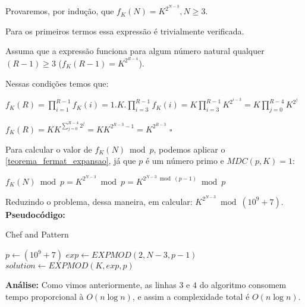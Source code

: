 Provaremos, por indução, que $f_K(N) = K^{2^{N-3}}, N \geq 3$.

Para os primeiros termos essa expressão é trivialmente verificada.

Assuma que a expressão funciona para algum número natural qualquer $(R-1) \geq 3$ ($f_K(R-1) = K^{2^{R-4}}$).

Nessas condições temos que: 

$f_K(R) = \prod_{i=1}^{R-1}f_K(i) = 1.K.\prod_{i=3}^{R-1}f_K(i) = K\prod_{i=3}^{R-1}K^{2^{i-3}} = K\prod_{j=0}^{R-4}K^{2^j}$

$f_K(R) = KK^{\sum_{j=0}^{R-4}2^j} = KK^{2^{R-3}-1} = K^{2^{R-3}}$ $\square$

Para calcular o valor de $f_K(N) \bmod p$, podemos aplicar o \autoref{teorema_fermat_expansao}, já que $p$ é um número primo e $MDC(p, K) = 1$:

$f_K(N) \bmod p = K^{2^{N-3}} \bmod p = K^{2^{N-3} \bmod (p-1)} \bmod p$ 

Reduzindo o problema, dessa maneira, em calcular: $K^{2^{N-3}} \bmod (10^9+7)$.
\\

\textbf{Pseudocódigo:}
\begin{algorithm}
\caption{Chef and Pattern}
\begin{algorithmic}[1]
\State $p \gets (10^9+7)$
\State $exp \gets EXPMOD(2, N-3, p-1)$ 
\State $solution \gets EXPMOD(K, exp, p)$ 
\State {}
\EndProcedure
\end{algorithmic}
\end{algorithm}

\textbf{Análise:}
Como vimos anteriormente, as linhas $3$ e $4$ do algoritmo consomem tempo proporcional à $O(n \log n)$, e assim a complexidade total é $O(n \log n)$.

